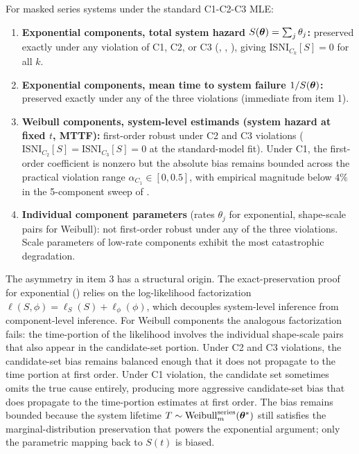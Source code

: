 \begin{corollary}
\label{cor:hierarchy}
For masked series systems under the standard C1-C2-C3 MLE:
\begin{enumerate}
    \item \textbf{Exponential components, total system hazard
        $S(\bm{\theta}) = \sum_j \theta_j$:} preserved exactly under any
        violation of C1, C2, or C3
        (, ,
        ), giving $\mathrm{ISNI}_{C_k}[S] = 0$
        for all $k$.
    \item \textbf{Exponential components, mean time to system failure
        $1/S(\bm{\theta})$:} preserved exactly under any of the three
        violations (immediate from item 1).
    \item \textbf{Weibull components, system-level estimands (system
        hazard at fixed $t$, MTTF):} first-order robust under C2 and C3
        violations ($\mathrm{ISNI}_{C_2}[S] = \mathrm{ISNI}_{C_3}[S] = 0$
        at the standard-model fit). Under C1, the first-order coefficient
        is nonzero but the absolute bias remains bounded across the
        practical violation range $\alpha_{C_1} \in [0, 0.5]$, with
        empirical magnitude below $4\%$ in the 5-component sweep of
        .
    \item \textbf{Individual component parameters} (rates $\theta_j$ for
        exponential, shape-scale pairs for Weibull): not first-order
        robust under any of the three violations. Scale parameters of
        low-rate components exhibit the most catastrophic degradation.
\end{enumerate}
\end{corollary}

The asymmetry in item 3 has a structural origin. The exact-preservation
proof for exponential () relies on the
log-likelihood factorization $\ell(S, \phi) = \ell_S(S) + \ell_\phi(\phi)$,
which decouples system-level inference from component-level inference. For
Weibull components the analogous factorization fails: the time-portion of
the likelihood involves the individual shape-scale pairs that also appear
in the candidate-set portion. Under C2 and C3 violations, the
candidate-set bias remains balanced enough that it does not propagate to
the time portion at first order. Under C1 violation, the candidate set
sometimes omits the true cause entirely, producing more aggressive
candidate-set bias that does propagate to the time-portion estimates at
first order. The bias remains bounded because the system lifetime
$T \sim \mathrm{Weibull}_m^{\mathrm{series}}(\bm{\theta}^*)$ still satisfies
the marginal-distribution preservation that powers the exponential
argument; only the parametric mapping back to $S(t)$ is biased.

